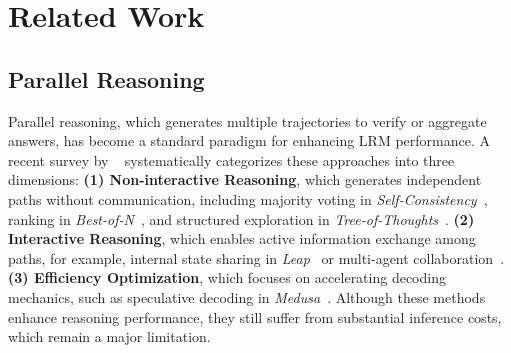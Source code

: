 \documentclass[11pt]{article}
\theoremstyle{plain}
\begin{document}


\section{Related Work}
\subsection{Parallel Reasoning}
\label{subsec:related_parallel}
Parallel reasoning, which generates multiple trajectories to verify or aggregate answers, has become a standard paradigm for enhancing LRM performance. 
A recent survey by ~\cite{wang2025parallel} systematically categorizes these approaches into three dimensions:
\textbf{(1) Non-interactive Reasoning}, which generates independent paths without communication, including majority voting in \textit{Self-Consistency}~\cite{wang2022self}, ranking in \textit{Best-of-N}~\cite{brown2024large}, and structured exploration in \textit{Tree-of-Thoughts}~\cite{yao2023tree}.
\textbf{(2) Interactive Reasoning}, which enables active information exchange among paths, for example, internal state sharing in \textit{Leap}~\cite{luo2025peers} or multi-agent collaboration~\cite{chan2023chamele}.
\textbf{(3) Efficiency Optimization}, which focuses on accelerating decoding mechanics, such as speculative decoding in \textit{Medusa}~\cite{cai2024medusa}.
Although these methods enhance reasoning performance, they still suffer from substantial inference costs, which remain a major limitation.
\end{document}
